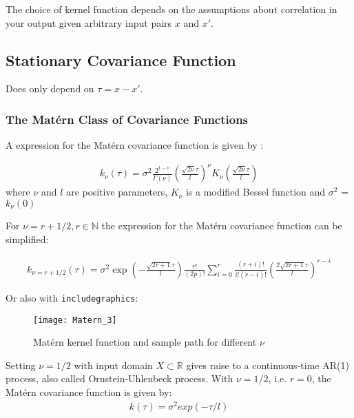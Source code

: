 The choice of kernel function depends on the assumptions about correlation in your output given arbitrary input pairs
$x$ and $x'$.


\subsection{Stationary Covariance Function}
Does only depend on $\tau = x - x'$.

\subsubsection{The Matérn Class of Covariance Functions}

A expression for the Matérn covariance function is given by \citeauthor{rasmussen_gaussian_2006}:

\begin{gather*}
    k_{\nu}(\tau) = \sigma^2 \frac{2^{1-\nu}}{\Gamma(\nu)}(\frac{\sqrt{2\nu} \tau}{l})^{\nu} K_{\nu}
    (\frac{\sqrt{2\nu} \tau}{l})
\end{gather*}
where $\nu$ and $l$ are positive parameters, $K_{\nu}$ is a modified Bessel function and
$\sigma^2$ = $k_{\nu}(0)$

For $\nu = r + 1/2, r \in \mathbb{N}$ the expression for the Matérn covariance function can be simplified:

\begin{gather}\label{kernel-matern}
    k_{\nu=r+1/2}(\tau) = \sigma^2 \exp(-\frac{\sqrt{2r + 1} \tau}{l}) \frac{r!}{(2p)!}
    \sum_{i=0}^{r} \frac{(r+i)!}{i!(r-i)!}(\frac{2 \sqrt{2 r + 1} \tau}{l})^{r-i}
\end{gather}


Or also with \texttt{includegraphics}:
\begin{figure}[hbt!]%
  \centering
  \texttt{[image: Matern\_3]} %
  \caption[Geyser data: binned histogram, Silverman's and another
  kernel]%
  {Matérn kernel function and sample path for different $\nu$}%
  \label{fig:matern}
\end{figure}


Setting $\nu = 1/2$ with input domain $X \subset \mathbb{R}$ gives raise to a continuous-time AR(1) process,
also called Ornstein-Uhlenbeck process.
With $\nu = 1/2$, i.e. $r=0$, the Matérn covariance function is given by:
\begin{gather}\label{kernel-matern-ar1}
    k(\tau) = \sigma^2 exp(- \tau/l)
\end{gather}


